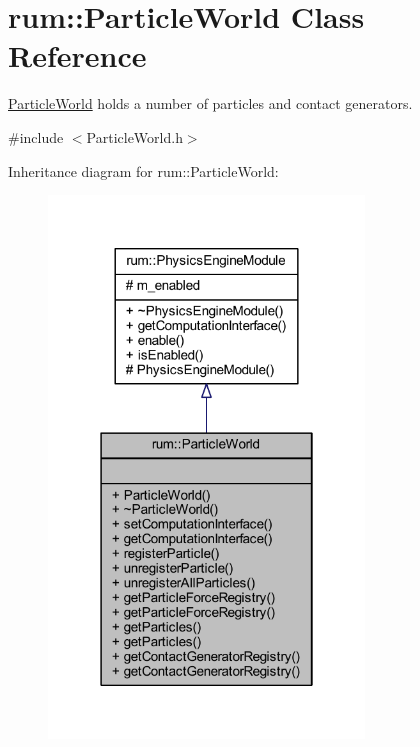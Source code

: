 \hypertarget{classrum_1_1_particle_world}{}\section{rum\+:\+:Particle\+World Class Reference}
\label{classrum_1_1_particle_world}


\mbox{\hyperlink{classrum_1_1_particle_world}{Particle\+World}} holds a number of particles and contact generators.  




{\ttfamily \#include $<$Particle\+World.\+h$>$}



Inheritance diagram for rum\+:\+:Particle\+World\+:\nopagebreak
\begin{figure}[H]
\begin{center}
\leavevmode
\includegraphics[width=238pt]{classrum_1_1_particle_world__inherit__graph}
\end{center}
\end{figure}


